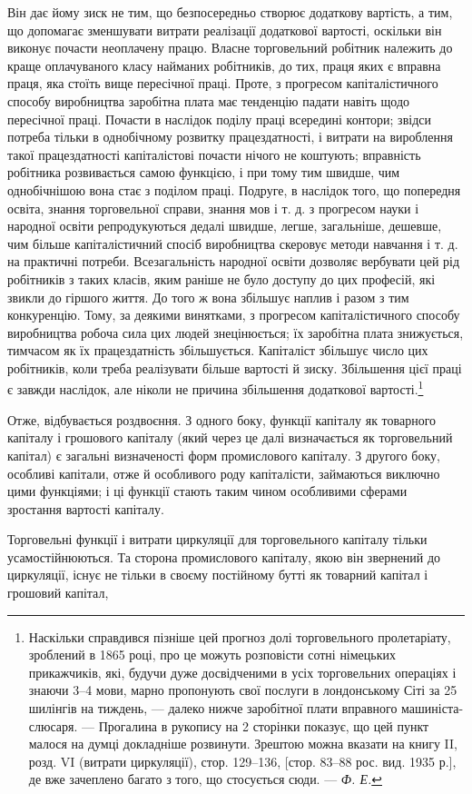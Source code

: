 \parcont{}  %
Він дає йому зиск не тим, що безпосередньо створює додаткову
вартість, а тим, що допомагає зменшувати витрати реалізації додаткової
вартості, оскільки він виконує почасти неоплачену працю.
Власне торговельний робітник належить до краще оплачуваного
класу найманих робітників, до тих, праця яких є вправна праця,
яка стоїть вище пересічної праці. Проте, з прогресом капіталістичного
способу виробництва заробітна плата має тенденцію
падати навіть щодо пересічної праці. Почасти в наслідок поділу
праці всередині контори; звідси потреба тільки в однобічному
розвитку працездатності, і витрати на вироблення такої працездатності
капіталістові почасти нічого не коштують; вправність
робітника розвивається самою функцією, і при тому тим швидше,
чим однобічнішою вона стає з поділом праці. Подруге, в наслідок
того, що попередня освіта, знання торговельної справи,
знання мов і т. д. з прогресом науки і народної освіти репродукуються
дедалі швидше, легше, загальніше, дешевше, чим
більше капіталістичний спосіб виробництва скеровує методи
навчання і т. д. на практичні потреби. Всезагальність народної
освіти дозволяє вербувати цей рід робітників з таких класів,
яким раніше не було доступу до цих професій, які звикли до
гіршого життя. До того ж вона збільшує наплив і разом з тим
конкуренцію. Тому, за деякими винятками, з прогресом капіталістичного
способу виробництва робоча сила цих людей знецінюється;
їх заробітна плата знижується, тимчасом як їх
працездатність збільшується. Капіталіст збільшує число цих
робітників, коли треба реалізувати більше вартості й зиску.
Збільшення цієї праці є завжди наслідок, але ніколи не причина
збільшення додаткової вартості.\footnote{
Наскільки справдився пізніше цей прогноз долі торговельного пролетаріату,
зроблений в 1865 році, про це можуть розповісти сотні німецьких
прикажчиків, які, будучи дуже досвідченими в усіх торговельних операціях
і знаючи 3--4 мови, марно пропонують свої послуги в лондонському Сіті за
25 шилінгів на тиждень, — далеко нижче заробітної плати вправного машиніста-слюсаря. — Прогалина в
рукопису на 2 сторінки показує, що цей пункт
малося на думці докладніше розвинути. Зрештою можна вказати на книгу II,
розд. VI (витрати циркуляції), стор. 129--136, [стор. 83--88 рос. вид. 1935 р.],
де вже зачеплено багато з того, що стосується сюди. — \emph{Ф. Е.}
}

Отже, відбувається роздвоєння. З одного боку, функції капіталу
як товарного капіталу і грошового капіталу (який через
це далі визначається як торговельний капітал) є загальні визначеності
форм промислового капіталу. З другого боку, особливі
капітали, отже й особливого роду капіталісти, займаються виключно
цими функціями; і ці функції стають таким чином особливими
сферами зростання вартості капіталу.

Торговельні функції і витрати циркуляції для торговельного
капіталу тільки усамостійнюються. Та сторона промислового капіталу,
якою він звернений до циркуляції, існує не тільки в своєму
постійному бутті як товарний капітал і грошовий капітал,
\parbreak{}  %
